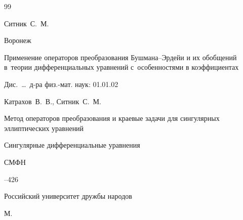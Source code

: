 \begin{thebibliography}{99}





\by Ситник~С.~М.


\publaddr Воронеж

\thesis Применение операторов преобразования Бушмана--Эрдейи и их обобщений в~теории дифференциальных уравнений с~особенностями в коэффициентах

\thesisinfo Дис.~\dots\ д-ра физ.-мат. наук: 01.01.02















\by Катрахов~В.~В., Ситник~С.~М.

\paper Метод операторов преобразования и краевые задачи для сингулярных эллиптических уравнений

\inbook Сингулярные дифференциальные уравнения

\serial СМФН




--426

\publ Российский университет дружбы народов

\publaddr М.





\end{thebibliography}

